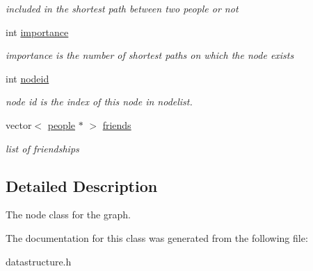 \begin{DoxyCompactItemize}
\begin{DoxyCompactList}\small\item\em included in the shortest path between two people or not \end{DoxyCompactList}\item 
\hypertarget{classpeople_a933888f9f3b5d203303292dc9297504c}{int \hyperlink{classpeople_a933888f9f3b5d203303292dc9297504c}{importance}}\label{classpeople_a933888f9f3b5d203303292dc9297504c}

\begin{DoxyCompactList}\small\item\em importance is the number of shortest paths on which the node exists \end{DoxyCompactList}\item 
\hypertarget{classpeople_a1107b6b96cc94fce17f872fee2522fa4}{int \hyperlink{classpeople_a1107b6b96cc94fce17f872fee2522fa4}{nodeid}}\label{classpeople_a1107b6b96cc94fce17f872fee2522fa4}

\begin{DoxyCompactList}\small\item\em node id is the index of this node in nodelist. \end{DoxyCompactList}\item 
\hypertarget{classpeople_a50b588dc8a8fec72358c6a09924c526d}{vector$<$ \hyperlink{classpeople}{people} $\ast$ $>$ \hyperlink{classpeople_a50b588dc8a8fec72358c6a09924c526d}{friends}}\label{classpeople_a50b588dc8a8fec72358c6a09924c526d}

\begin{DoxyCompactList}\small\item\em list of friendships \end{DoxyCompactList}\end{DoxyCompactItemize}


\subsection{\-Detailed \-Description}
\-The node class for the graph. 

\-The documentation for this class was generated from the following file\-:\begin{DoxyCompactItemize}
\item 
datastructure.\-h\end{DoxyCompactItemize}
